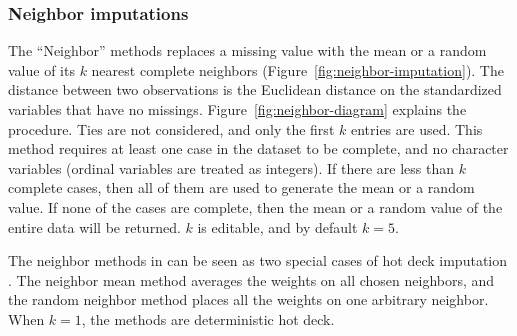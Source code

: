 \documentclass[article]{jss}
\begin{document}
\subsubsection{Neighbor imputations}

The ``Neighbor'' methods replaces a missing value with the mean or a random value of its $k$ nearest complete neighbors (Figure~\ref{fig:neighbor-imputation}). The distance between two observations is the Euclidean distance on the standardized variables that have no missings. Figure~\ref{fig:neighbor-diagram} explains the procedure. Ties are not considered, and only the first $k$ entries are used. This method requires at least one case in the dataset to be complete, and no character variables (ordinal variables are treated as integers). If there are less than $k$ complete cases, then all of them are used to generate the mean or a random value. If none of the cases are complete, then the mean or a random value of the entire data will be returned. $k$ is editable, and by default $k=5$.

The neighbor methods in  can be seen as two special cases of hot deck imputation \citep{andridge2010review}. The neighbor mean method averages the weights on all chosen neighbors, and the random neighbor method places all the weights on one arbitrary neighbor. When $k=1$, the methods are deterministic hot deck.

\end{document}

